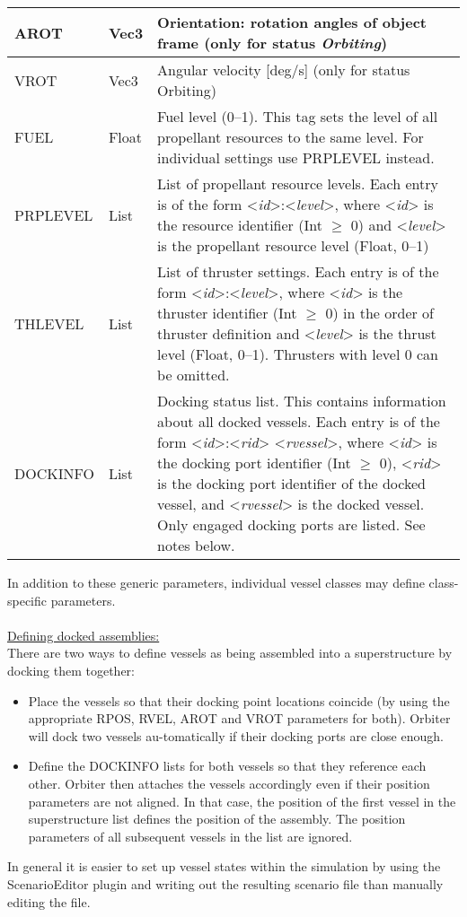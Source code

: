 \documentclass[Orbiter Developer Manual.tex]{subfiles}
\begin{document}
\begin{longtable}{ |p{}|p{}|p{}| }
	\hline\rule{0pt}{2ex}
	AROT & Vec3 & Orientation: rotation angles of object frame (only for status \textit{Orbiting})\\
	\hline\rule{0pt}{2ex}
	VROT & Vec3 & Angular velocity [deg/s] (only for status Orbiting)\\
	\hline\rule{0pt}{2ex}
	FUEL & Float & Fuel level (0–1). This tag sets the level of all propellant resources to the same level. For individual settings use PRPLEVEL instead.\\
	\hline\rule{0pt}{2ex}
	PRPLEVEL & List & List of propellant resource levels. Each entry is of the form <\textit{id}>:<\textit{level}>, where <\textit{id}> is the resource identifier (Int $\geq$ 0) and <\textit{level}> is the propellant resource level (Float, 0–1)\\
	\hline\rule{0pt}{2ex}
	THLEVEL & List & List of thruster settings. Each entry is of the form <\textit{id}>:<\textit{level}>, where <\textit{id}> is the thruster identifier (Int $\geq$ 0) in the order of thruster definition and <\textit{level}> is the thrust level (Float, 0–1). Thrusters with level 0 can be omitted.\\
	\hline\rule{0pt}{2ex}
	DOCKINFO & List & Docking status list. This contains information about all docked vessels. Each entry is of the form <\textit{id}>:<\textit{rid}> <\textit{rvessel}>, where <\textit{id}> is the docking port identifier (Int $\geq$ 0), <\textit{rid}> is the docking port identifier of the docked vessel, and <\textit{rvessel}> is the docked vessel. Only engaged docking ports are listed. See notes below.\\
	\hline
	\end{longtable}

\noindent
In addition to these generic parameters, individual vessel classes may define class-specific parameters.\\
\\
\underline{Defining docked assemblies:}\\
There are two ways to define vessels as being assembled into a superstructure by docking them together:

\begin{itemize}
\item Place the vessels so that their docking point locations coincide (by using the appropriate RPOS, RVEL, AROT and VROT parameters for both). Orbiter will dock two vessels au-tomatically if their docking ports are close enough.
\item Define the DOCKINFO lists for both vessels so that they reference each other. Orbiter then attaches the vessels accordingly even if their position parameters are not aligned. In that case, the position of the first vessel in the superstructure list defines the position of the assembly. The position parameters of all subsequent vessels in the list are ignored.
\end{itemize}

\noindent
In general it is easier to set up vessel states within the simulation by using the ScenarioEditor plugin and writing out the resulting scenario file than manually editing the file.
\end{document}

